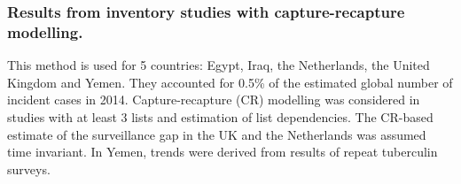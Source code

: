 \subsubsection {Results from inventory studies with capture-recapture modelling\cite{WHO2012}.} This method is used for 5 countries: Egypt\cite{20487611}, Iraq\cite{23485379}, the Netherlands\cite{17156496}, the United Kingdom\cite{Anderson2010} and Yemen\cite{23485378}. They accounted for 0.5\% of the estimated global number of incident cases in 2014. Capture-recapture (CR) modelling was considered in studies with at least 3 lists and estimation of list dependencies. The CR-based estimate of the surveillance gap in the UK and the Netherlands was assumed time invariant. In Yemen, trends were derived from results of repeat tuberculin surveys\cite{19723398}. 

